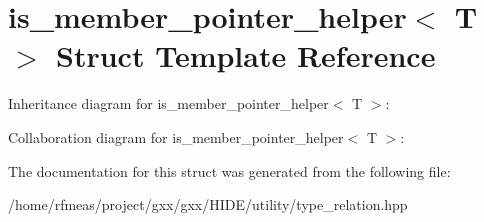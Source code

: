 \hypertarget{structis__member__pointer__helper}{}\section{is\+\_\+member\+\_\+pointer\+\_\+helper$<$ T $>$ Struct Template Reference}
\label{structis__member__pointer__helper}


Inheritance diagram for is\+\_\+member\+\_\+pointer\+\_\+helper$<$ T $>$\+:


Collaboration diagram for is\+\_\+member\+\_\+pointer\+\_\+helper$<$ T $>$\+:


The documentation for this struct was generated from the following file\+:\begin{DoxyCompactItemize}
\item 
/home/rfmeas/project/gxx/gxx/\+H\+I\+D\+E/utility/type\+\_\+relation.\+hpp\end{DoxyCompactItemize}
